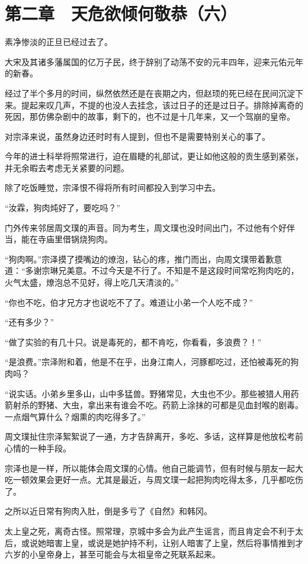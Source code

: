 \section{第二章　天危欲倾何敬恭（六）}

素净惨淡的正旦已经过去了。

大宋及其诸多藩属国的亿万子民，终于辞别了动荡不安的元丰四年，迎来元佑元年的新春。

经过了半个多月的时间，纵然依然还是在丧期之内，但赵顼的死已经在民间沉淀下来。提起来叹几声，不提的也没人去挂念，该过日子的还是过日子。排除掉离奇的死因，那仿佛杂剧中的故事，剩下的，也不过是十几年来，又一个驾崩的皇帝。

对宗泽来说，虽然身边还时时有人提到，但也不是需要特别关心的事了。

今年的进士科举将照常进行，迫在眉睫的礼部试，更让如他这般的贡生感到紧张，并无余暇去考虑无关紧要的问题。

除了吃饭睡觉，宗泽恨不得将所有时间都投入到学习中去。

“汝霖，狗肉炖好了，要吃吗？”

门外传来邻居周文璞的声音。同为考生，周文璞也没时间出门，不过他有个好伴当，能在寺庙里借锅烧狗肉。

“狗肉啊。”宗泽摸了摸嘴边的燎泡，钻心的疼，推门而出，向周文璞带着歉意道：“多谢宗琳兄美意。不过今天是不行了。不知是不是这段时间常吃狗肉吃的，火气太盛，燎泡总不见好，得上吃几天清淡的。”

“你也不吃，伯才兄方才也说吃不了了。难道让小弟一个人吃不成？”

“还有多少？”

“做了实验的有几十只。说是毒死的，都不肯吃，你看看，多浪费？！”

“是浪费。”宗泽附和着，他是不在乎，出身江南人，河豚都吃过，还怕被毒死的狗肉吗？

“说实话。小弟乡里多山，山中多猛兽。野猪常见，大虫也不少。那些被猎人用药箭射杀的野猪、大虫，拿出来有谁会不吃。药箭上涂抹的可都是见血封喉的剧毒。一点烟气算什么？烟熏的肉吃得多了。”

周文璞扯住宗泽絮絮说了一通，方才告辞离开，多吃、多话，这样算是他放松考前心情的一种手段。

宗泽也是一样，所以能体会周文璞的心情。他自己能调节，但有时候与朋友一起大吃一顿效果会更好一点。尤其是最近，与周文璞一起把狗肉吃得太多，几乎都吃伤了。

之所以近日常有狗肉入肚，倒是多亏了《自然》和韩冈。

太上皇之死，离奇古怪。照常理，京城中多会为此产生谣言，而且肯定会不利于太后，或说她暗害上皇，或说是她护持不利，让别人暗害了上皇，然后将事情推到才六岁的小皇帝身上，甚至可能会与太祖皇帝之死联系起来。

